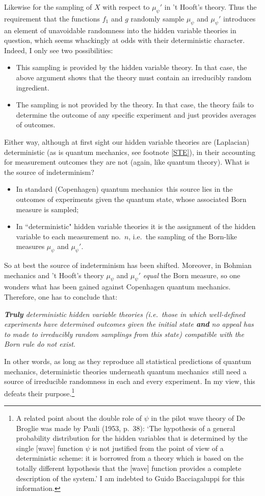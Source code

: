 \documentclass[11pt,a4paper]{article}
\numberwithin{equation}{section}
\newcommand{\qm}{quantum mechanics}
\begin{document}
Likewise for the sampling of $X$ with respect to $\mu_{\psi}'$ in 't Hooft's theory.
Thus the requirement that the functions $f_1$ and $g$ randomly sample $\mu_{\psi}$ and $\mu_{\psi}'$ 
 introduces an element of unavoidable randomness into the hidden variable theories in question, which seems whackingly at odds with their deterministic character. 
 Indeed, I only see two possibilities:
\begin{itemize}
\item  This sampling is provided by the hidden variable theory. In that case, the above argument shows that the theory must contain an irreducibly random ingredient.
\item  The sampling is not provided by the theory. In that case, the theory fails to determine the outcome of any specific experiment and just provides averages of outcomes.
\end{itemize}
Either way, although at first sight our hidden variable theories are (Laplacian) deterministic (as is quantum mechanics, see footnote \ref{STE}), in their accounting for measurement outcomes they are not (again, like quantum theory). 
What is the source of indeterminism?
\begin{itemize}
\item  In standard (Copenhagen) \qm\  this source lies in the outcomes of experiments given the quantum state, whose associated Born measure is sampled;
\item In ``deterministic" hidden variable theories it is the assignment of the hidden variable to each measurement no.\ $n$, i.e.\ the sampling of the Born-like measures $\mu_{\psi}$ and $\mu_{\psi}'$.
\end{itemize}
So at best the source  of indeterminism has been shifted. Moreover, in Bohmian mechanics and 't Hooft's theory $\mu_{\psi}$ and $\mu_{\psi}'$ 
 \emph{equal} the Born measure, so one wonders what has been gained against Copenhagen \qm.
Therefore, one has to conclude \vspace{5pt} that:

\noindent \emph{\textbf{Truly} deterministic hidden variable theories (i.e.\ those in which well-defined experiments have determined outcomes \emph{given} the initial state \textbf{and} no appeal has to made to irreducibly random samplings  \emph{from} this state) compatible with the Born rule  do not exist}.\vspace{5pt}

\noindent
In other words,  as long as they reproduce all statistical predictions of \qm, deterministic theories underneath \qm\ still need a source of irreducible randomness in each and every experiment.  In my view, this defeats their purpose.\footnote{A related point about the double role of $\psi$ in  the pilot wave theory of De Broglie was made by Pauli  (1953, p.\ 38): `The hypothesis of a general probability distribution for the hidden variables that is determined by the single [wave] function $\psi$ is not justified from the point of view of a deterministic scheme: it is borrowed from a theory which is based on the totally different hypothesis that the [wave] function provides a complete description of the system.'
I am indebted to Guido Bacciagaluppi for this information.}
\end{document}
